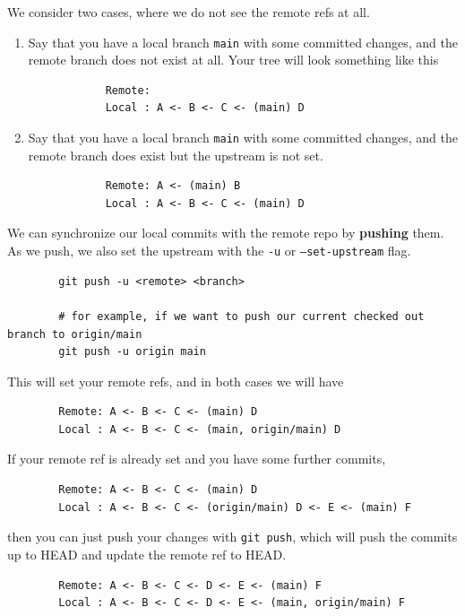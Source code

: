 \documentclass{article}
\begin{document}
    \begin{definition} 
      We consider two cases, where we do not see the remote refs at all. 
      \begin{enumerate}
        \item Say that you have a local branch \texttt{main} with some committed changes, and the remote branch does not exist at all. Your tree will look something like this 
          \begin{lstlisting}
            Remote: 
            Local : A <- B <- C <- (main) D
          \end{lstlisting}
        \item Say that you have a local branch \texttt{main} with some committed changes, and the remote branch does exist but the upstream is not set. 
          \begin{lstlisting}
            Remote: A <- (main) B
            Local : A <- B <- C <- (main) D
          \end{lstlisting}
      \end{enumerate}
      We can synchronize our local commits with the remote repo by \textbf{pushing} them. As we push, we also set the upstream with the \texttt{-u} or \texttt{--set-upstream} flag. 
      \begin{lstlisting}
        git push -u <remote> <branch> 
        
        # for example, if we want to push our current checked out branch to origin/main
        git push -u origin main
      \end{lstlisting}
      This will set your remote refs, and in both cases we will have 
      \begin{lstlisting}
        Remote: A <- B <- C <- (main) D
        Local : A <- B <- C <- (main, origin/main) D
      \end{lstlisting}
    \end{definition}

    \begin{definition}[Push] 
      If your remote ref is already set and you have some further commits, 
      \begin{lstlisting}
        Remote: A <- B <- C <- (main) D
        Local : A <- B <- C <- (origin/main) D <- E <- (main) F
      \end{lstlisting}
      then you can just push your changes with \texttt{git push}, which will push the commits up to HEAD and update the remote ref to HEAD. 
      \begin{lstlisting}
        Remote: A <- B <- C <- D <- E <- (main) F
        Local : A <- B <- C <- D <- E <- (main, origin/main) F
      \end{lstlisting}
    \end{definition} 
\end{document}
